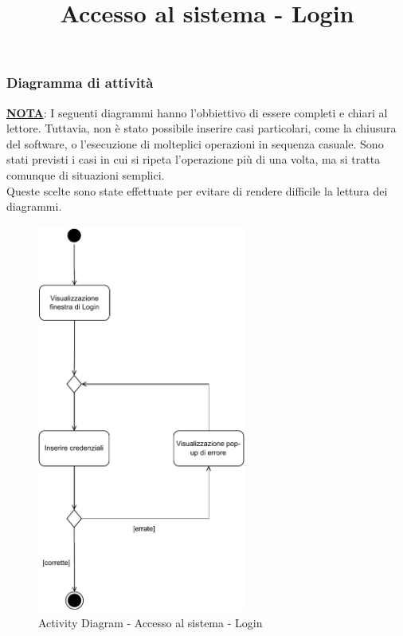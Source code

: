 \documentclass[a4paper,11pt]{article}
\begin{document}
\subsubsection{Diagramma di attività}
\underline{\textbf{NOTA}}: I seguenti diagrammi hanno l'obbiettivo di essere completi e chiari al lettore. Tuttavia, non è stato possibile inserire casi particolari, come la chiusura del software, o l'esecuzione di molteplici operazioni in sequenza casuale. Sono stati previsti i casi in cui si ripeta l'operazione più di una volta, ma si tratta comunque di situazioni semplici.\\
Queste scelte sono state effettuate per evitare di rendere difficile la lettura dei diagrammi.
\begin{center}
	\title{\textbf{Accesso al sistema - Login}}
	\maketitle
\end{center}
\begin{figure}[htpb]
	\centering
	\includegraphics[width=0.61\textwidth]{diagrams/Activity_Diagram_-_Login.pdf}
	\caption{Activity Diagram - Accesso al sistema - Login}
	\label{fig:act_dia_login}
\end{figure}
\end{document}
